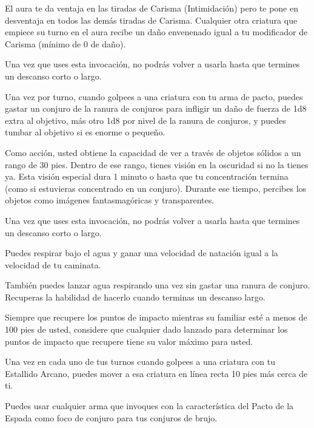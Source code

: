 \documentclass[a4paper,twocolumn,openany,10pt]{dndbook}
\begin{document}
El aura te da ventaja en las tiradas de Carisma (Intimidación) pero te pone en desventaja en todos las demás tiradas de
Carisma. Cualquier otra criatura que empiece su turno en el aura recibe un daño envenenado igual a tu modificador de Carisma
(mínimo de 0 de daño).

Una vez que uses esta invocación, no podrás volver a usarla hasta que termines un descanso corto o largo.

Una vez por turno, cuando golpees a una criatura con tu arma de pacto, puedes gastar un conjuro de la ranura de conjuros para
infligir un daño de fuerza de 1d8 extra al objetivo, más otro 1d8 por nivel de la ranura de conjuros, y puedes tumbar al
objetivo si es enorme o pequeño.

Como acción, usted obtiene la capacidad de ver a través de objetos sólidos a un rango de 30 pies. Dentro de ese rango, tienes
visión en la oscuridad si no la tienes ya. Esta visión especial dura 1 minuto o hasta que tu concentración termina (como si
estuvieras concentrado en un conjuro). Durante ese tiempo, percibes los objetos como imágenes fantasmagóricas y transparentes.

Una vez que uses esta invocación, no podrás volver a usarla hasta que termines un descanso corto o largo. 

Puedes respirar bajo el agua y ganar una velocidad de natación igual a la velocidad de tu caminata.

También puedes lanzar agua respirando una vez sin gastar una ranura de conjuro. Recuperas la habilidad de hacerlo cuando
terminas un descanso largo.

Siempre que recupere los puntos de impacto mientras su familiar esté a menos de 100 pies de usted, considere que cualquier dado
lanzado para determinar los puntos de impacto que recupere tiene su valor máximo para usted. 

Una vez en cada uno de tus turnos cuando golpees a una criatura con tu Estallido Arcano, puedes mover a esa criatura en línea
recta 10 pies más cerca de ti.

Puedes usar cualquier arma que invoques con la característica del Pacto de la Espada como foco de conjuro para tus conjuros de
brujo.
\end{document}

